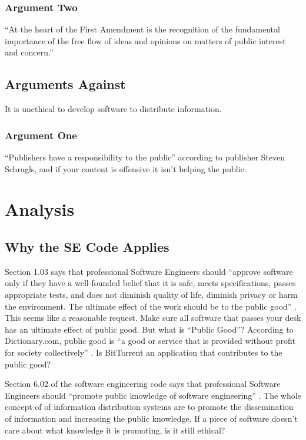 \documentclass[11pt]{article}
\begin{document}
\subsubsection{Argument Two}
``At the heart of the First Amendment is the recognition of the fundamental importance of the free flow of ideas and opinions on matters of public interest and concern.'' \cite[51]{1988hustler}

\subsection{Arguments Against}
It is unethical to develop software to distribute information.

\subsubsection{Argument One}

``Publishers have a responsibility to the public'' according to publisher Steven Schragls, and if your content is offensive it isn't helping the public. \cite[46]{hawker}

\section{Analysis}

\subsection{Why the SE Code Applies}

Section 1.03 says that professional Software Engineers should ``approve software only if they have a well-founded belief that it is safe, meets specifications, passes appropriate tests, and does not diminish quality of life, diminish privacy or harm the environment. The ultimate effect of the work should be to the public good'' \cite[1.03]{secode}. This seems like a reasonable request. Make sure all software that passes your desk has an ultimate effect of public good. But what is ``Public Good''? According to Dictionary.com, public good is ``a good or service that is provided without profit for society collectively'' \cite{pubgooddef}. Is BitTorrent an application that contributes to the public good?

Section 6.02 of the software engineering code says that professional Software Engineers should ``promote public knowledge of software engineering'' \cite[6.02]{secode}. The whole concept of of information distribution systems are to promote the dissemination of information and increasing the public knowledge. If a piece of software doesn't care about what knowledge it is promoting, is it still ethical?
\end{document}
